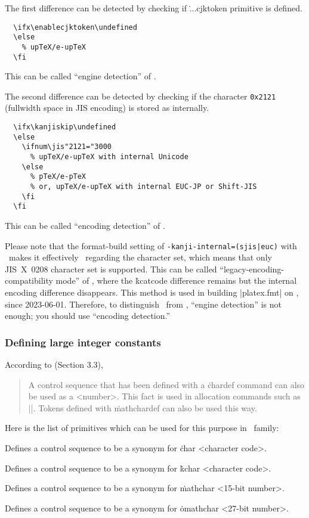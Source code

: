 \documentclass[a4paper,11pt,dvipdfmx]{article}
\def\code#1{\texttt{#1}}
\begin{document}
The first difference can be detected by checking if
\.{...cjktoken} primitive is defined.
\begin{verbatim}
  \ifx\enablecjktoken\undefined
  \else
    % upTeX/e-upTeX
  \fi
\end{verbatim}
This can be called ``engine detection'' of \upTeX.

The second difference can be detected by checking if
the character \code{0x2121} (fullwidth space in JIS encoding)
is stored as  internally.
\begin{verbatim}
  \ifx\kanjiskip\undefined
  \else
    \ifnum\jis"2121="3000
      % upTeX/e-upTeX with internal Unicode
    \else
      % pTeX/e-pTeX
      % or, upTeX/e-upTeX with internal EUC-JP or Shift-JIS
    \fi
  \fi
\end{verbatim}
This can be called ``encoding detection'' of \upTeX.

Please note that
the format-build setting of \verb+-kanji-internal=(sjis|euc)+ with
\upTeX\ makes it effectively \pTeX\ regarding the character set,
which means that only JIS~X~0208 character set is supported.
This can be called ``legacy-encoding-compatibility mode''
of \upTeX, where the \.{kcatcode} difference remains
but the internal encoding difference disappears.
This method is used in building |platex.fmt| on \eupTeX,
since 2023-06-01. Therefore, to distinguish \upLaTeX\ from \pLaTeX,
``engine detection'' is not enough; you should use ``encoding detection.''


\subsubsection{Defining large integer constants}
\label{chardef}

According to \cite{topic} (Section 3.3),
\begin{quote}
A control sequence that has been defined with a \.{chardef} command
can also be used as a <number>.
This fact is used in allocation commands such as |\newbox|.
Tokens defined with \.{mathchardef} can also be used this way.
\end{quote}
Here is the list of primitives which can be used for this purpose
in \pTeX\ family:
\begin{simplelist}
 \csitem[\.{chardef} <control sequence>=<character code>]
  Defines a control sequence to be a synonym for
  \.{char} <character code>.

 \csitem[\.{kchardef} <control sequence>=<character code> (for \upTeX/\eupTeX)]
  Defines a control sequence to be a synonym for
  \.{kchar} <character code>.

 \csitem[\.{mathchardef} <control sequence>=<15-bit number>]
  Defines a control sequence to be a synonym for
  \.{mathchar} <15-bit number>.

 \csitem[\.{omathchardef} <control sequence>=<27-bit number> (for \epTeX/\eupTeX)]
  Defines a control sequence to be a synonym for
  \.{omathchar} <27-bit number>.
\end{simplelist}
\end{document}
